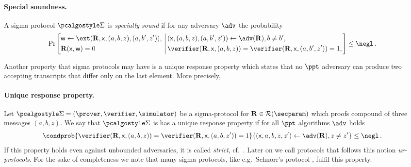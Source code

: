 \documentclass[runningheads,11pt]{llncs}
\begin{document}
\paragraph{Special soundness.} A sigma protocol $\sigmaprot$ is \emph{specially-sound}
  if for any adversary $\adv$ the probability
	\[
		\Pr\left[
		\begin{aligned}
				& \wit \gets \ext(\REL, \inp, (a, b, z), (a, b', z')),\\
				& \REL(\inp, \wit) = 0
		\end{aligned}
		\,\left|\,
		\begin{aligned}
          & (\inp, (a, b, z), (a, b', z')) \gets \adv(\REL), %
           b \neq b',  \\
          & \verifier(\REL, \inp, (a, b, z)) = %
            \verifier(\REL, \inp, (a, b', z')) = 1, \\
		\end{aligned}
		\right.\right] \leq  \negl\,.
	\]

Another property that sigma protocols may have is a unique response
property \cite{C:Fischlin05} which states that no $\ppt$ adversary can
produce two accepting transcripts that differ only on the last
element. More precisely, 
\paragraph{Unique response property.} Let
$\sigmaprot = (\prover, \verifier, \simulator)$ be a sigma-protocol for
$\REL \in \RELGEN(\secparam)$ which proofs compound of three messages
$(a, b, z)$. We say that $\sigmaprot$ is has a unique response property if for
all $\ppt$ algorithms $\adv$ holds
\[ \condprob{\verifier (\REL, \inp, (a, b, z)) = \verifier (\REL, \inp, (a, b,
    z')) = 1}{(\inp, a, b, z, z') \gets \adv(\REL), z \neq z'} \leq \negl\,.  \]
If this property holds even against unbounded adversaries, it is called
\emph{strict}, cf.~\cite{INDOCRYPT:FKMV12}. Later on we call protocols that
follows this notion \emph{ur-protocols}. For the sake of completeness we note
that many sigma protocols, like e.g.~Schnorr's protocol \cite{C:Schnorr89},
fulfil this property.
\end{document}
